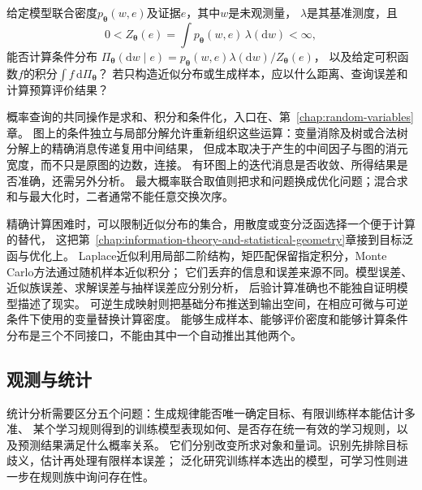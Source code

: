 \begin{mathproblem}
  \label{question:future-probabilistic-query}
  给定模型联合密度$p_{\bm\theta}(w,e)$及证据$e$，其中$w$是未观测量，
  $\lambda$是其基准测度，且
  \[
    0<Z_{\bm\theta}(e)=\int p_{\bm\theta}(w,e)\,\lambda(\mathrm dw)<\infty,
  \]
  能否计算条件分布
  $\Pi_{\bm\theta}(\mathrm dw\mid e)=p_{\bm\theta}(w,e)\lambda(\mathrm dw)/Z_{\bm\theta}(e)$，
  以及给定可积函数$f$的积分$\int f\,\mathrm d\Pi_{\bm\theta}$？
  若只构造近似分布或生成样本，应以什么距离、查询误差和计算预算评价结果？
\end{mathproblem}

概率查询的共同操作是求和、积分和条件化，入口在、第~\ref{chap:random-variables}章。
图上的条件独立与局部分解允许重新组织这些运算：变量消除及树或合法树分解上的精确消息传递复用中间结果，
但成本取决于产生的中间因子与图的消元宽度，而不只是原图的边数，连接。
有环图上的迭代消息是否收敛、所得结果是否准确，还需另外分析。
最大概率联合取值则把求和问题换成优化问题；混合求和与最大化时，二者通常不能任意交换次序。

精确计算困难时，可以限制近似分布的集合，用散度或变分泛函选择一个便于计算的替代，
这把第~\ref{chap:information-theory-and-statistical-geometry}章接到目标泛函与优化上。
Laplace近似利用局部二阶结构，矩匹配保留指定积分，Monte Carlo方法通过随机样本近似积分；
它们丢弃的信息和误差来源不同。模型误差、近似族误差、求解误差与抽样误差应分别分析，
后验计算准确也不能独自证明模型描述了现实。
可逆生成映射则把基础分布推送到输出空间，在相应可微与可逆条件下使用的变量替换计算密度。
能够生成样本、能够评价密度和能够计算条件分布是三个不同接口，不能由其中一个自动推出其他两个。

\subsection{观测与统计}
\label{sec:future-data-law-object-map}
\label{sec:future-information-proxy-map}
\label{sec:future-generalization-learnability-map}
\label{sec:future-reliability-map}
\label{sec:future-fairness-alignment-interpretation-map}

统计分析需要区分五个问题：生成规律能否唯一确定目标、有限训练样本能估计多准、
某个学习规则得到的训练模型表现如何、是否存在统一有效的学习规则，以及预测结果满足什么概率关系。
它们分别改变所求对象和量词。识别先排除目标歧义，估计再处理有限样本误差；
泛化研究训练样本选出的模型，可学习性则进一步在规则族中询问存在性。


